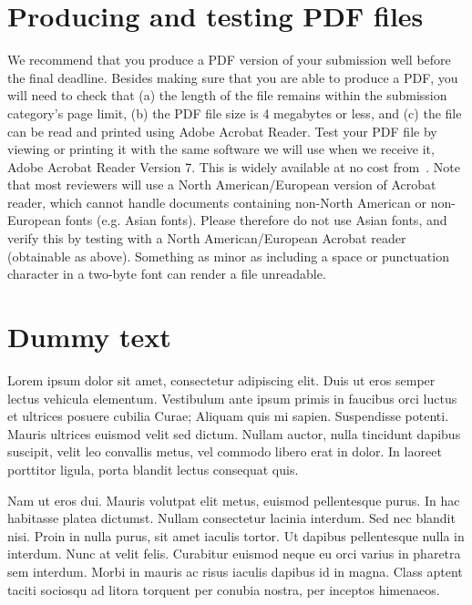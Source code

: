 \documentclass{ubicomp-ext}
\begin{document}
\section{Producing and testing PDF files}
We recommend that you produce a PDF version of your submission well before the final deadline. 
Besides making sure that you are able to produce a PDF, you will need to check that (a) the length of the file remains within the submission category's page limit, (b) the PDF file size is 4 megabytes or less, and (c) the file can be read and printed using Adobe Acrobat Reader. 
Test your PDF file by viewing or printing it with the same software we will use when we receive it, Adobe Acrobat Reader Version 7. 
This is widely available at no cost from~\cite{Acrobat7}.  
Note that most reviewers will use a North American/European version of Acrobat reader, which cannot handle documents containing non-North American or non-European fonts (e.g. Asian fonts).  
Please therefore do not use Asian fonts, and verify this by testing with a North American/European Acrobat reader (obtainable as above). Something as minor as including a space or punctuation character in a two-byte font can render a file unreadable.


\section{Dummy text}
Lorem ipsum dolor sit amet, consectetur adipiscing elit. Duis ut eros semper lectus vehicula elementum. Vestibulum ante ipsum primis in faucibus orci luctus et ultrices posuere cubilia Curae; Aliquam quis mi sapien. Suspendisse potenti. Mauris ultrices euismod velit sed dictum. Nullam auctor, nulla tincidunt dapibus suscipit, velit leo convallis metus, vel commodo libero erat in dolor. In laoreet porttitor ligula, porta blandit lectus consequat quis. 

Nam ut eros dui. Mauris volutpat elit metus, euismod pellentesque purus. In hac habitasse platea dictumst. Nullam consectetur lacinia interdum. Sed nec blandit nisi. Proin in nulla purus, sit amet iaculis tortor. Ut dapibus pellentesque nulla in interdum. Nunc at velit felis. Curabitur euismod neque eu orci varius in pharetra sem interdum. Morbi in mauris ac risus iaculis dapibus id in magna. Class aptent taciti sociosqu ad litora torquent per conubia nostra, per inceptos himenaeos.
\end{document}
